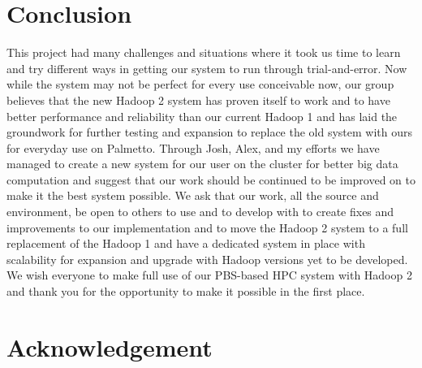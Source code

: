 \documentclass[conference]{IEEEtran}
\begin{document}
		\section{Conclusion}
			This project had many challenges and situations where it took us time to learn and try different ways in getting our system to run through trial-and-error.  Now while the system may not be perfect for every use conceivable now, our group believes that the new Hadoop 2 system has proven itself to work and to have better performance and reliability than our current Hadoop 1 and has laid the groundwork for further testing and expansion to replace the old system with ours for everyday use on Palmetto.  Through Josh, Alex, and my efforts we have managed to create a new system for our user on the cluster for better big data computation and suggest that our work should be continued to be improved on to make it the best system possible.  We ask that our work, all the source and environment, be open to others to use and to develop with to create fixes and improvements to our implementation and to move the Hadoop 2 system to a full replacement of the Hadoop 1 and have a dedicated system in place with scalability for expansion and upgrade with Hadoop versions yet to be developed.  We wish everyone to make full use of our PBS-based HPC system with Hadoop 2 and thank you for the opportunity to make it possible in the first place.

	
	\section*{Acknowledgement}



\end{document}
